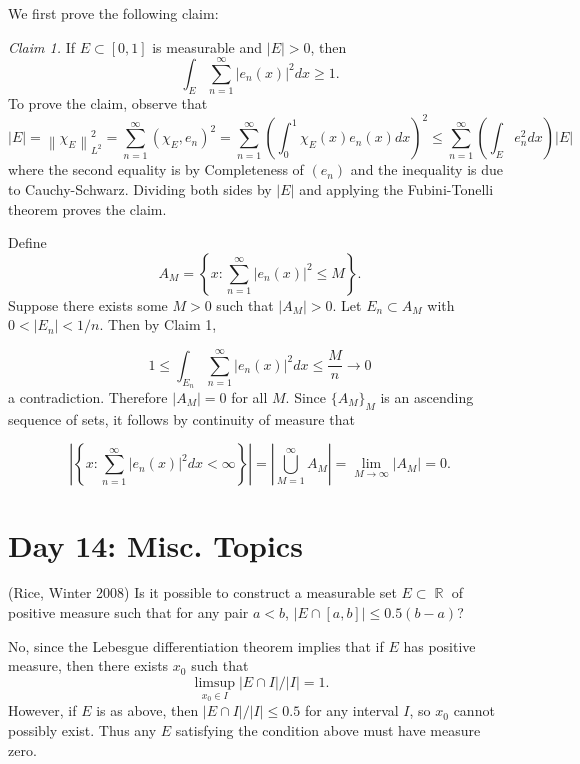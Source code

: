 \documentclass[answers]{exam}
\DeclareMathOperator{\RR}{\mathbb{R}}
\theoremstyle{problemstyle}
\newcommand{\norm}[1]{\left\lVert#1\right\rVert} %
\newcommand{\1}[1]{\textbf{1}_{\left[#1\right]}} %
\def\({\left (}
\def\){\right )}
\begin{document}
\begin{questions}
\begin{parts}
\begin{solution}
We first prove the following claim: 

  \textit{Claim 1.} If $E\subset [0,1]$ is measurable and $|E|>0$, then
  \begin{equation*}
    \int_{E} \sum_{n=1}^{\infty} \left| e_{n}(x) \right|^{2}dx \geq 1.
  \end{equation*}
  To prove the claim, observe that
  \begin{equation*}
    |E|= \norm{\chi_{E}}_{L^{2}}^{2}  = \sum_{n=1}^{\infty} (\chi_{E},e_{n})^{2} = \sum_{n=1}^{\infty} \left( \int_0^{1}\chi_{E}(x) e_{n}(x)dx \right)^{2}\leq \sum_{n=1}^{\infty} \(\int_{E} e_{n}^{2}dx \) |E|
  \end{equation*}
  where the second equality is by Completeness of $(e_{n})$ and the inequality is due to Cauchy-Schwarz. Dividing both sides by $|E|$ and applying the Fubini-Tonelli theorem proves the claim.

  Define
  \begin{equation*}
  A_M = \left\{ x:  \sum_{n=1}^{\infty} |e_n(x)|^2 \leq M\right\}.
  \end{equation*}
  Suppose there exists some $M>0$ such that $|A_M|>0$. Let $E_n\subset A_M$ with $0<|E_n|<1/n$. Then by Claim 1,
  
  $$1\leq \int_{E_n} \sum_{n=1}^{\infty} \left| e_{n}(x) \right|^{2}dx \leq \frac{M}{n} \to 0$$
  a contradiction. Therefore $|A_M|=0$ for all $M$. Since $\{A_M\}_M$ is an ascending sequence of sets, it follows by continuity of measure that
  
  $$\left|\left\{x: \sum_{n=1}^{\infty} |e_n(x)|^2 dx <\infty\right\}\right|=\left|\bigcup_{M=1}^{\infty} A_M\right| = \lim_{M\to\infty} |A_M| =0.$$
\end{solution}
\end{parts}





\newpage
\section{Day 14: Misc. Topics}

\question (Rice, Winter 2008) Is it possible to construct a measurable set $E \subset \RR$ of positive measure such that for any pair $a < b$, $|E \cap [a,b]| \leq 0.5 (b - a)$?
\begin{solution}
    No, since the Lebesgue differentiation theorem implies that if $E$ has positive measure, then there exists $x_0$ such that
    \[ \limsup_{x_0 \in I} |E \cap I|/|I| = 1. \]
    However, if $E$ is as above, then $|E \cap I| / |I| \leq 0.5$ for any interval $I$, so $x_0$ cannot possibly exist. Thus any $E$ satisfying the condition above must have measure zero.
\end{solution}


\end{questions}
\end{document}
